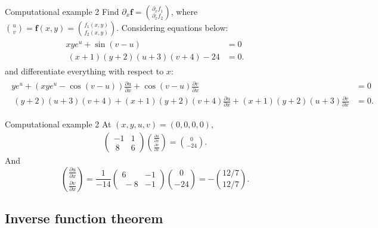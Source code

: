 \begin{frame}{Computational example 2}
    Find $\partial_x \mathbf f = \binom{\partial_x f_1}{\partial_x f_2}$, where $\binom uv = \mathbf f(x,y) = \binom{f_1(x,y)}{f_2(x,y)}$. Considering equations below:
    \begin{align}
        \begin{aligned}
            xye^u +  \sin(v-u) &= 0\\\
            (x+1)(y+2)(u+3)(v+4) - 24 &=0.
        \end{aligned}
    \end{align}
    and differentiate everything with respect to $x$:
    \begin{align}
        \begin{aligned}
            ye^u + \left( xy e^u - \cos(v-u)\right) \frac{\partial u}{\partial x} + \cos(v-u)\frac{\partial v}{\partial x} &= 0\\\
            (y+2)(u+3)(v+4) +(x+1)(y+2)(v+4)\frac{\partial u}{\partial x} +(x+1)(y+2)(u+3)\frac{\partial v}{\partial x}   &=0.
        \end{aligned}
    \end{align}
\end{frame}

\begin{frame}{Computational example 2}
    At $(x,y,u,v) = (0,0,0,0)$,
    \begin{align}
    \left(\begin{array}{rr}
    -1&1\\\ 8&6
    \end{array}
    \right)\binom
    {\frac{\partial u}{\partial x}}
    {\frac{\partial v}{\partial x}} = \binom 0{-24}.
    \label{concrete}\end{align}
    And
    \begin{equation}
            \binom{\frac{\partial u}{\partial x}}
{\frac{\partial v}{\partial x}} = \frac{1}{-14}
\left(
\begin{array}{rr}
6&-1 \\\
-8&-1
\end{array}
\right)\binom0 {-24} =  -\binom{12/7}{12/7}.
    \end{equation}
\end{frame}

\subsection{Inverse function theorem}

